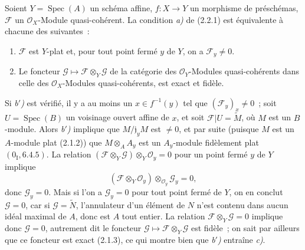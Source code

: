 \begin{proposition}[2.2.2]
\label{IV.2.2.2-fr}
Soient $Y=\operatorname{Spec}(A)$ un schéma affine, $f:X\to Y$ un morphisme
de préschémas, $\mathscr F$ un $\mathcal O_X$-Module quasi-cohérent. La
condition \emph{a)} de (2.2.1) est équivalente à chacune des suivantes~:
\begin{enumerate}
\item[\emph{b$'$)}] $\mathscr F$ est $Y$-plat et, pour tout point fermé $y$
de $Y$, on a $\mathscr F_y\neq0$.
\item[\emph{c)}] Le foncteur
$\mathscr G\mapsto\mathscr F\otimes_Y\mathscr G$ de la catégorie des
$\mathcal O_Y$-Modules quasi-cohérents dans celle des
$\mathcal O_X$-Modules quasi-cohérents, est exact et fidèle.
\end{enumerate}
\end{proposition}

Si \emph{b$'$)} est vérifié, il y a au moins un $x\in f^{-1}(y)$ tel que
$(\mathscr F_y)_x\neq0$~; soit $U=\operatorname{Spec}(B)$ un voisinage ouvert
affine de $x$, et soit $\mathscr F|U=\widetilde M$, où $M$ est un $B$-module.
Alors \emph{b$'$)} implique que $M/\mathfrak j_yM$ est $\neq0$, et par suite
(puisque $M$ est un $A$-module plat (2.1.2)) que
$M\otimes_A A_y$ est un $A_y$-module fidèlement plat
$(0_{\mathrm I},6.4.5)$. La relation
$(\mathscr F\otimes_Y\mathscr G)\otimes_Y\mathcal O_y=0$ pour un point fermé
$y$ de $Y$ implique
\[
(\mathscr F\otimes_Y\mathcal O_y)\otimes_{\mathcal O_y}\mathscr G_y=0,
\]
donc $\mathscr G_y=0$. Mais si l'on a $\mathscr G_y=0$ pour tout point fermé
de $Y$, on en conclut $\mathscr G=0$, car si $\mathscr G=\widetilde N$,
l'annulateur d'un élément de $N$ n'est contenu dans aucun idéal maximal de
$A$, donc est $A$ tout entier. La relation
$\mathscr F\otimes_Y\mathscr G=0$ implique donc $\mathscr G=0$, autrement dit
le foncteur $\mathscr G\mapsto\mathscr F\otimes_Y\mathscr G$ est fidèle~; on
sait par ailleurs que ce foncteur est exact (2.1.3), ce qui montre bien que
\emph{b$'$)} entraîne \emph{c)}.

